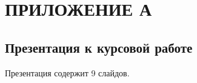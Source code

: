 \chapter*{\hfill{\centering ПРИЛОЖЕНИЕ А}\hfill}

\section*{\hfill{\centering Презентация к курсовой работе}\hfill}

Презентация содержит 9 слайдов.